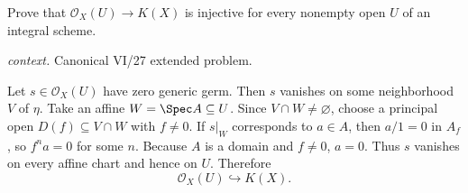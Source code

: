 \begin{problem}\label{prob:vi27-p07}
Prove that \(\mathcal O_X(U)\to K(X)\) is injective for every nonempty open \(U\) of an integral scheme.
\par\smallskip\noindent\textit{context.} Canonical VI/27 extended problem.
\end{problem}

\ifdefined\FullProblemDossiers
\begin{solution}
Let \(s\in\mathcal O_X(U)\) have zero generic germ. Then \(s\) vanishes on some neighborhood \(V\) of
\(\eta\). Take an affine \(W=\Spec A\subseteq U\). Since \(V\cap W\ne\varnothing\), choose a principal open
\(D(f)\subseteq V\cap W\) with \(f\ne0\). If \(s|_W\) corresponds to \(a\in A\), then \(a/1=0\) in \(A_f\),
so \(f^na=0\) for some \(n\). Because \(A\) is a domain and \(f\ne0\), \(a=0\). Thus \(s\) vanishes on every
affine chart and hence on \(U\). Therefore
\[
\mathcal O_X(U)\hookrightarrow K(X).
\]
\end{solution}
\fi
